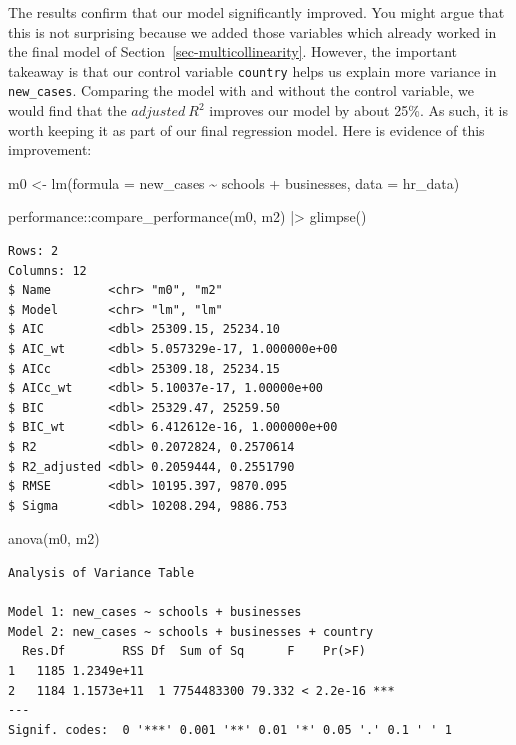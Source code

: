\documentclass[
  letterpaper,
  DIV=11,
  numbers=noendperiod]{scrreprt}
\newenvironment{Shaded}{\begin{snugshade}}{\end{snugshade}}
\newcommand{\AttributeTok}[1]{\textcolor[rgb]{0.40,0.45,0.13}{#1}}
\newcommand{\FunctionTok}[1]{\textcolor[rgb]{0.28,0.35,0.67}{#1}}
\newcommand{\NormalTok}[1]{\textcolor[rgb]{0.00,0.23,0.31}{#1}}
\newcommand{\OtherTok}[1]{\textcolor[rgb]{0.00,0.23,0.31}{#1}}
\newcommand{\SpecialCharTok}[1]{\textcolor[rgb]{0.37,0.37,0.37}{#1}}
\begin{document}
The results confirm that our model significantly improved. You might
argue that this is not surprising because we added those variables which
already worked in the final model of
Section~\ref{sec-multicollinearity}. However, the important takeaway is
that our control variable \texttt{country} helps us explain more
variance in \texttt{new\_cases}. Comparing the model with and without
the control variable, we would find that the \(adjusted\ R^2\) improves
our model by about 25\%. As such, it is worth keeping it as part of our
final regression model. Here is evidence of this improvement:

\begin{Shaded}
\begin{Highlighting}[]
\NormalTok{m0 }\OtherTok{\textless{}{-}} \FunctionTok{lm}\NormalTok{(}\AttributeTok{formula =}\NormalTok{ new\_cases }\SpecialCharTok{\textasciitilde{}}
\NormalTok{           schools }\SpecialCharTok{+}
\NormalTok{           businesses,}
         \AttributeTok{data =}\NormalTok{ hr\_data)}

\NormalTok{performance}\SpecialCharTok{::}\FunctionTok{compare\_performance}\NormalTok{(m0, m2) }\SpecialCharTok{|\textgreater{}}
  \FunctionTok{glimpse}\NormalTok{()}
\end{Highlighting}
\end{Shaded}

\begin{verbatim}
Rows: 2
Columns: 12
$ Name        <chr> "m0", "m2"
$ Model       <chr> "lm", "lm"
$ AIC         <dbl> 25309.15, 25234.10
$ AIC_wt      <dbl> 5.057329e-17, 1.000000e+00
$ AICc        <dbl> 25309.18, 25234.15
$ AICc_wt     <dbl> 5.10037e-17, 1.00000e+00
$ BIC         <dbl> 25329.47, 25259.50
$ BIC_wt      <dbl> 6.412612e-16, 1.000000e+00
$ R2          <dbl> 0.2072824, 0.2570614
$ R2_adjusted <dbl> 0.2059444, 0.2551790
$ RMSE        <dbl> 10195.397, 9870.095
$ Sigma       <dbl> 10208.294, 9886.753
\end{verbatim}

\begin{Shaded}
\begin{Highlighting}[]
\FunctionTok{anova}\NormalTok{(m0, m2)}
\end{Highlighting}
\end{Shaded}

\begin{verbatim}
Analysis of Variance Table

Model 1: new_cases ~ schools + businesses
Model 2: new_cases ~ schools + businesses + country
  Res.Df        RSS Df  Sum of Sq      F    Pr(>F)    
1   1185 1.2349e+11                                   
2   1184 1.1573e+11  1 7754483300 79.332 < 2.2e-16 ***
---
Signif. codes:  0 '***' 0.001 '**' 0.01 '*' 0.05 '.' 0.1 ' ' 1
\end{verbatim}
\end{document}
